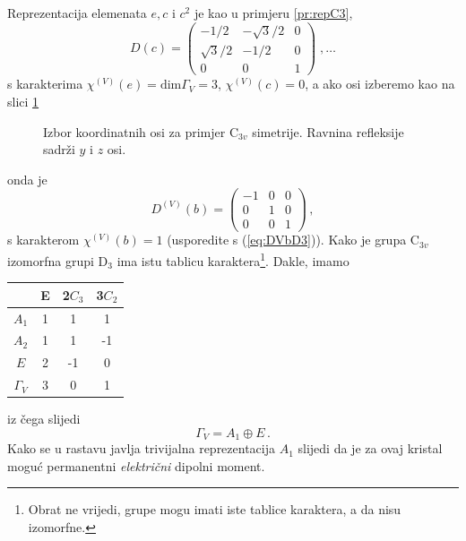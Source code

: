 Reprezentacija elemenata $e, c$ i  $c^2$ je kao u primjeru \ref{pr:repC3},
\begin{displaymath}
D(c)=
\left(
\begin{array}{ccc}
-1/2 & -\sqrt{3}/2 & 0 \\
\sqrt{3}/2 & -1/2 & 0 \\
0 & 0 & 1
\end{array}\right) \;, \ldots
\end{displaymath}
s karakterima $\chi^{(V)}(e)=\mbox{dim}\Gamma_{V}=3$, $\chi^{(V)}(c)=0$,
a ako osi izberemo kao na slici \ref{fig:C3vravnina}
\begin{figure}[ht]
    \centerline{}
    \caption{\label{fig:C3vravnina} Izbor koordinatnih osi za primjer C$_{3v}$
    simetrije. Ravnina refleksije sadrži $y$ i $z$ osi.}
\end{figure}
onda je 
\begin{displaymath}
D^{(V)}(b)=
\begin{pmatrix}
-1 & 0 & 0 \\
0 & 1 & 0 \\
0 & 0 & 1
\end{pmatrix} \,,
\end{displaymath}
s karakterom $\chi^{(V)}(b)=1$ (usporedite s (\ref{eq:DVbD3})).
Kako je grupa C$_{3v}$ izomorfna grupi D$_3$ ima istu tablicu karaktera\footnote{Obrat
ne vrijedi, grupe mogu imati iste tablice karaktera, a da nisu izomorfne.}. Dakle,
imamo 
\begin{center}
\begin{tabular}{c|ccc}
  & E & 2$C_3$  & 3$C_2$ \\ \hline
$A_1$ & 1 & 1& 1 \\
$A_2$ & 1 & 1&-1 \\
 $E$  & 2 &-1& 0 \\ \hline
 $\Gamma_V$ & 3 & 0 & 1
\end{tabular}
\end{center}
iz čega slijedi
\begin{displaymath}
   \Gamma_{V} = A_1  \oplus E \,.
\end{displaymath}
Kako se u rastavu javlja trivijalna reprezentacija $A_1$  slijedi
da je za ovaj kristal moguć permanentni \emph{električni} dipolni
moment.   

